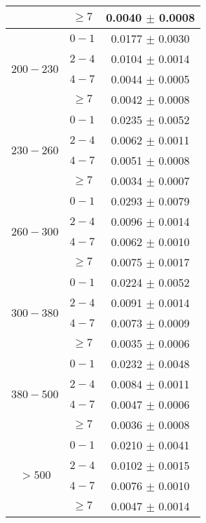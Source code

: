 \begin{table}[h!]
\begin{tabular}{c|c|c}
                          & $\geq 7$  & 0.0040 $\pm$ 0.0008 \\\hline
\multirow{4}{*}{$200-230$} & $0-1$    & 0.0177 $\pm$ 0.0030 \\      
                          & $2-4$     & 0.0104 $\pm$ 0.0014 \\      
                          & $4-7$     & 0.0044 $\pm$ 0.0005 \\      
                          & $\geq 7$  & 0.0042 $\pm$ 0.0008 \\\hline
\multirow{4}{*}{$230-260$} & $0-1$    & 0.0235 $\pm$ 0.0052 \\      
                          & $2-4$     & 0.0062 $\pm$ 0.0011 \\      
                          & $4-7$     & 0.0051 $\pm$ 0.0008 \\      
                          & $\geq 7$  & 0.0034 $\pm$ 0.0007 \\\hline
\multirow{4}{*}{$260-300$} & $0-1$    & 0.0293 $\pm$ 0.0079 \\      
                          & $2-4$     & 0.0096 $\pm$ 0.0014 \\      
                          & $4-7$     & 0.0062 $\pm$ 0.0010 \\      
                          & $\geq 7$  & 0.0075 $\pm$ 0.0017 \\\hline
\multirow{4}{*}{$300-380$} & $0-1$    & 0.0224 $\pm$ 0.0052 \\      
                          & $2-4$     & 0.0091 $\pm$ 0.0014 \\      
                          & $4-7$     & 0.0073 $\pm$ 0.0009 \\      
                          & $\geq 7$  & 0.0035 $\pm$ 0.0006 \\\hline
\multirow{4}{*}{$380-500$} & $0-1$    & 0.0232 $\pm$ 0.0048 \\      
                          & $2-4$     & 0.0084 $\pm$ 0.0011 \\      
                          & $4-7$     & 0.0047 $\pm$ 0.0006 \\      
                          & $\geq 7$  & 0.0036 $\pm$ 0.0008 \\\hline
\multirow{4}{*}{$> 500$}   & $0-1$    & 0.0210 $\pm$ 0.0041 \\      
                          & $2-4$     & 0.0102 $\pm$ 0.0015 \\      
                          & $4-7$     & 0.0076 $\pm$ 0.0010 \\      
                          & $\geq 7$  & 0.0047 $\pm$ 0.0014 \\\hline
\end{tabular}                                 
\end{table}
